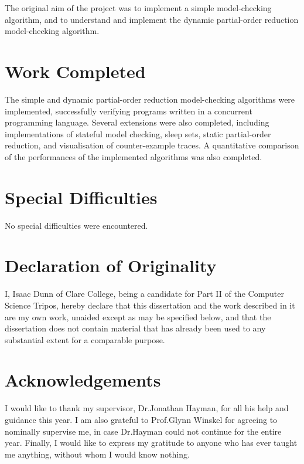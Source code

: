 \documentclass[12pt,a4paper,twoside,openany]{report}
\begin{document}
The original aim of the project was to implement
a simple model-checking algorithm, and to
understand and implement the dynamic partial-order reduction
model-checking algorithm.

\section*{Work Completed}

The simple and dynamic partial-order reduction
model-checking algorithms
were implemented, successfully verifying
programs written in a concurrent programming language.
Several extensions were
also completed, including implementations of
stateful model checking, sleep sets,
static partial-order reduction,
and visualisation of counter-example
traces. A quantitative comparison of the
performances of the implemented
algorithms was also completed.

\section*{Special Difficulties}

No special difficulties were encountered.
 
\section*{Declaration of Originality}

I, Isaac Dunn of Clare College, being a candidate for Part II of the Computer
Science Tripos, hereby declare
that this dissertation and the work described in it are my own work,
unaided except as may be specified below, and that the dissertation
does not contain material that has already been used to any substantial
extent for a comparable purpose.

\bigskip
{}

\bigskip
{}

\setcounter{tocdepth}{1} %
\tableofcontents

\newpage
\section*{Acknowledgements}
I would like to thank my supervisor,
Dr.\@ Jonathan Hayman, for all his help
and guidance this year. I am
also grateful to Prof.\@ Glynn Winskel for
agreeing to nominally supervise me,
in case Dr.\@ Hayman could not continue
for the entire year. Finally, I would
like to express my gratitude to anyone
who has ever taught me anything, without
whom I would know nothing.
\end{document}
